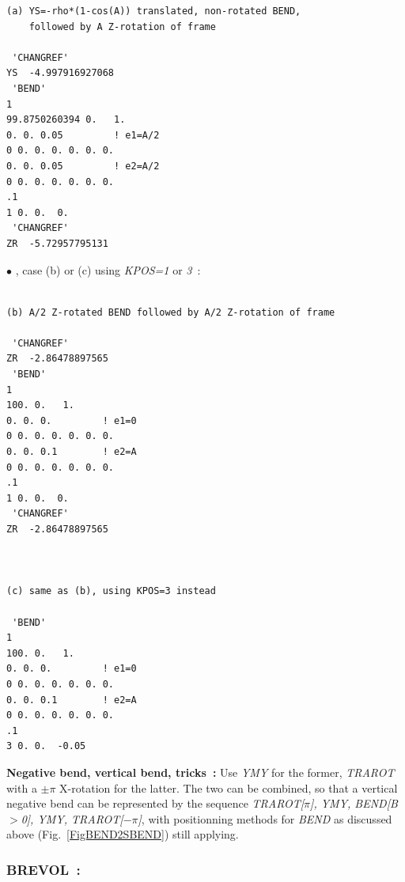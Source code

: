 {\begin{minipage}{.49\linewidth}
\begin{minipage}{.49\linewidth}
\begin{verbatim}
(a) YS=-rho*(1-cos(A)) translated, non-rotated BEND, 
    followed by A Z-rotation of frame

 'CHANGREF'                                                                       
YS  -4.997916927068
 'BEND'                                                                           
1	
99.8750260394 0.   1.
0. 0. 0.05         ! e1=A/2
0 0. 0. 0. 0. 0. 0.
0. 0. 0.05         ! e2=A/2
0 0. 0. 0. 0. 0. 0.
.1
1 0. 0.  0.
 'CHANGREF'                                                                       
ZR  -5.72957795131

\end{verbatim}
\end{minipage} 
\end{minipage} 
\begin{minipage}{.49\linewidth}
$\bullet$ \zgou, case (b) or (c) using \textsl{KPOS=1} or \textsl{3}~: 

\scriptsize
\begin{verbatim}

(b) A/2 Z-rotated BEND followed by A/2 Z-rotation of frame

 'CHANGREF'                                                                       
ZR  -2.86478897565
 'BEND'                                                                           
1	
100. 0.   1.
0. 0. 0.         ! e1=0
0 0. 0. 0. 0. 0. 0.
0. 0. 0.1        ! e2=A
0 0. 0. 0. 0. 0. 0.
.1
1 0. 0.  0.
 'CHANGREF' 
ZR  -2.86478897565


 
(c) same as (b), using KPOS=3 instead

 'BEND'        
1	
100. 0.   1.
0. 0. 0.         ! e1=0
0 0. 0. 0. 0. 0. 0.
0. 0. 0.1        ! e2=A
0 0. 0. 0. 0. 0. 0.
.1
3 0. 0.  -0.05
\end{verbatim}
\end{minipage}


\bigskip


\noindent \textbf{Negative bend, vertical bend, tricks~:} Use \textsl{YMY}  for the former, 
\textsl{TRAROT}  with a $\pm \pi$ X-rotation for the latter.   
The two can be combined, so that a vertical negative bend can be represented by the  sequence
\textsl{TRAROT[$\pi$], YMY, BEND[B$>$0], YMY, TRAROT[$-\pi$]}, with  positionning methods for \textsl{BEND} as 
discussed above (Fig.~\ref{FigBEND2SBEND}) still applying. 




\newpage


\subsubsection*{BREVOL~: \BREVOLTitl} \label{BREVOL}
\medskip

}

